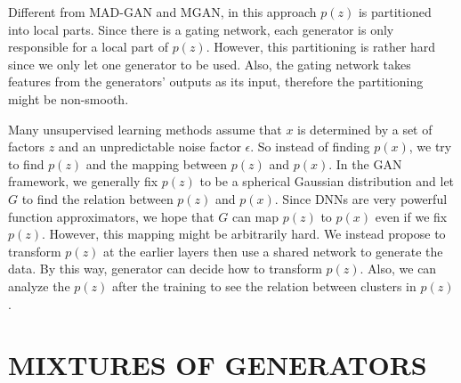 \documentclass[a4paper,onesided,12pt]{report}
\begin{document}
Different from MAD-GAN and MGAN, in this approach $p(z)$ is partitioned into local parts. Since there is a gating network, each generator is only responsible for a local part of $p(z)$. However, this partitioning is rather hard since we only let one generator to be used. Also, the gating network takes features from the generators' outputs as its input, therefore the partitioning might be non-smooth.

Many unsupervised learning methods assume that $x$ is determined by a set of factors $z$ and an unpredictable noise factor $\epsilon$. So instead of finding $p(x)$, we try to find $p(z)$ and the mapping between $p(z)$ and $p(x)$. In the GAN framework, we generally fix $p(z)$ to be a spherical Gaussian distribution and let $G$ to find the relation between $p(z)$ and $p(x)$. Since DNNs are very powerful function approximators, we hope that $G$ can map $p(z)$ to $p(x)$ even if we fix $p(z)$. However, this mapping might be arbitrarily hard. We instead propose to transform $p(z)$ at the earlier layers then use a shared network to generate the data. By this way, generator can decide how to transform $p(z)$. Also, we can analyze the $p(z)$ after the training to see the relation between clusters in $p(z)$.
%
%
\chapter{MIXTURES OF GENERATORS}
\label{chapter:mixture_gan}
\end{document}
